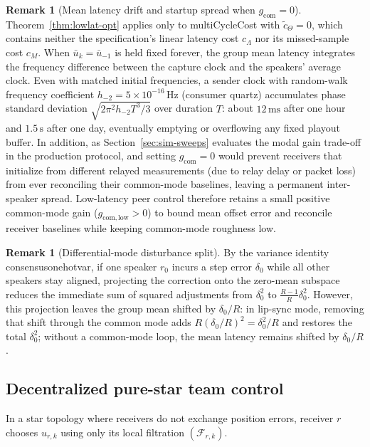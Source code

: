 \documentclass[11pt,a4paper]{article}
\DeclareRobustCommand{\lean}[1]{{\ttfamily\def\_{\textunderscore\allowbreak}#1}}
\theoremstyle{definition}
\newtheorem{remark}[definition]{Remark}
\begin{document}
\begin{remark}[Mean latency drift and startup spread when $g_{\mathrm{com}} = 0$]
\label{rem:drift}
Theorem~\ref{thm:lowlat-opt} applies only to \lean{multiCycleCost} with
$\tilde c_\Theta = 0$, which contains neither the specification's linear latency
cost $c_\Lambda$ nor its missed-sample cost $c_M$. When $\bar u_k = \bar u_{-1}$
is held fixed forever, the group mean latency integrates the frequency
difference between the capture clock and the speakers' average clock. Even with
matched initial frequencies, a sender clock with random-walk frequency
coefficient $h_{-2} = 5\times 10^{-16}\,\text{Hz}$ (consumer quartz) accumulates
phase standard deviation $\sqrt{2\pi^2 h_{-2} T^3 / 3}$ over duration $T$:
about $12\,\text{ms}$ after one hour and $1.5\,\text{s}$ after one day,
eventually emptying or overflowing any fixed playout buffer. In addition, as
Section~\ref{sec:sim-sweeps} evaluates the modal gain trade-off in the
production protocol, and setting $g_{\mathrm{com}} = 0$ would prevent
receivers that initialize from different relayed measurements (due to relay
delay or packet loss) from ever reconciling their common-mode baselines,
leaving a permanent inter-speaker spread. Low-latency peer control therefore
retains a small positive common-mode gain ($g_{\mathrm{com,low}} > 0$) to
bound mean offset error and reconcile receiver baselines while keeping
common-mode roughness low.
\end{remark}

\begin{remark}[Differential-mode disturbance split]
By the variance identity \lean{consensus\_one\_hot\_var}, if one speaker
$r_0$ incurs a step error $\delta_0$ while all other speakers stay aligned,
projecting the correction onto the zero-mean subspace reduces the immediate sum
of squared adjustments from $\delta_0^2$ to $\frac{R-1}{R}\delta_0^2$. However,
this projection leaves the group mean shifted by $\delta_0 / R$: in lip-sync
mode, removing that shift through the common mode adds
$R(\delta_0 / R)^2 = \delta_0^2 / R$ and restores the total $\delta_0^2$;
without a common-mode loop, the mean latency remains shifted by $\delta_0 / R$.
\end{remark}

\subsection{Decentralized pure-star team control}

In a star topology where receivers do not exchange position errors, receiver
$r$ chooses $u_{r,k}$ using only its local filtration $(\mathcal{F}_{r,k})$.
\end{document}
